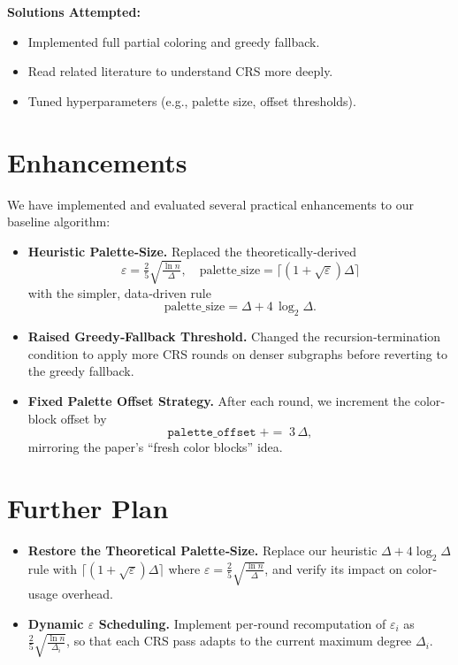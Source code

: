 \documentclass[11pt]{article}
\begin{document}
\textbf{Solutions Attempted:}
\begin{itemize}
  \item Implemented full partial coloring and greedy fallback.
  \item Read related literature to understand CRS more deeply.
  \item Tuned hyperparameters (e.g., palette size, offset thresholds).
\end{itemize}

\section{Enhancements}

  We have implemented and evaluated several practical enhancements to our baseline algorithm:

\begin{itemize}
  \item \textbf{Heuristic Palette‐Size.} 
    Replaced the theoretically‐derived
    \[
      \varepsilon = \tfrac{2}{5}\sqrt{\tfrac{\ln n}{\Delta}},
      \quad
      \text{palette\_size} = \bigl\lceil(1+\sqrt{\varepsilon})\Delta\bigr\rceil
    \]
    with the simpler, data‐driven rule
    \[
      \text{palette\_size} = \Delta + 4\,\log_{2}\!\Delta.
    \]
  
  
  \item \textbf{Raised Greedy‐Fallback Threshold.}
    Changed the recursion‐termination condition to apply more CRS rounds on denser subgraphs before reverting to the greedy fallback.
  
  \item \textbf{Fixed Palette Offset Strategy.}
    After each round, we increment the color‐block offset by
    \[
      \texttt{palette\_offset} \;+=\; 3\,\Delta,
    \]
    mirroring the paper’s “fresh color blocks” idea. 
\end{itemize}

\section{Further Plan}
\begin{itemize}
  \item \textbf{Restore the Theoretical Palette‐Size.}
    Replace our heuristic \(\Delta + 4\log_2\!\Delta\) rule with
    \(\lceil(1+\sqrt{\varepsilon})\Delta\rceil\) where
    \(\varepsilon=\tfrac25\sqrt{\tfrac{\ln n}{\Delta}}\), and verify
    its impact on color‐usage overhead.

  \item \textbf{Dynamic \(\varepsilon\) Scheduling.}
    Implement per‐round recomputation of \(\varepsilon_i\) as
    \(\tfrac25\sqrt{\tfrac{\ln n}{\Delta_i}}\), so that each CRS pass
    adapts to the current maximum degree \(\Delta_i\). 
\end{itemize}
\end{document}
